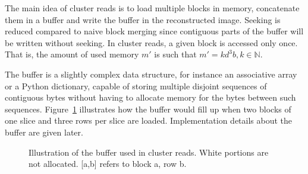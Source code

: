 \documentclass[10pt, conference, compsocconf]{IEEEtran}
\begin{document}
The main idea of cluster reads is to load multiple blocks in memory,
concatenate them in a buffer and write the buffer in the reconstructed
image. Seeking is reduced compared to naive block merging since
contiguous parts of the buffer will be written without seeking. In
cluster reads, a given block is accessed only once. That is, the
amount of used memory $m'$ is such that $m'=kd^3b, k \in \mathbb{N}$.

The buffer is a
slightly complex data structure, for instance an associative array or
a Python dictionary, capable of storing multiple disjoint sequences of
contiguous bytes without having to allocate memory for the bytes
between such sequences. Figure~\ref{fig:cluster-reads-buffer}
illustrates how the buffer would fill up when two blocks of one slice
and three rows per slice are loaded. Implementation details about the
buffer are given later.
\begin{figure}
\centering
\def\svgwidth{\columnwidth}

\caption{Illustration of the buffer used in cluster reads. White
  portions are not allocated. [a,b] refers to block a, row b.}
\label{fig:cluster-reads-buffer}
\end{figure}
\end{document}
